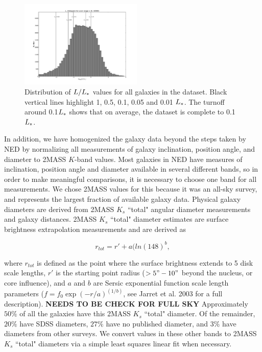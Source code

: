\documentclass[iop]{emulateapj-rtx4}
\begin{document}
\begin{figure}[ht!]
        \centering
        \vspace{-10pt}
        \includegraphics[width=0.52\textwidth]{completeness_hist.pdf}
        \caption{\small{Distribution of $L/L_{\**}$ values for all galaxies in the dataset. Black vertical lines highlight 1, 0.5, 0.1, 0.05 and 0.01 $L_{\**}$. The turnoff around 0.1$L_{\**}$ shows that on average, the dataset is complete to 0.1$L_{\**}$.}}
        \label{completeness}
\end{figure} 

In addition, we have homogenized the galaxy data beyond the steps taken by NED by normalizing all measurements of galaxy inclination, position angle, and diameter to 2MASS $K$-band values. Most galaxies in NED have measures of inclination, position angle and diameter available in several different bands, so in order to make meaningful comparisons, it is necessary to choose one band for all measurements. We chose 2MASS values for this because it was an all-sky survey, and represents the largest fraction of available galaxy data. Physical galaxy diameters are derived from 2MASS $K_s$ ``total" angular diameter measurements and galaxy distances. 2MASS $K_s$ ``total" diameter estimates are surface brightness extrapolation measurements and are derived as 

\begin{equation}
r_{tot} = r' + a(ln(148)^b,
\end{equation}

\noindent where $r_{tot}$ is defined as the point where the surface brightness extends to 5 disk scale lengths, $r'$ is the starting point radius ($>5" - 10"$ beyond the nucleus, or core influence), and $a$ and $b$ are Sersic exponential function scale length parameters ($f = f_0 \exp{(-r/a)}^{(1/b)}$, see Jarret et al. 2003 for a full description). \textbf{NEEDS TO BE CHECK FOR FULL SKY} Approximately $50\%$ of all the galaxies have this 2MASS $K_s$ ``total" diameter. Of the remainder, $20\%$ have SDSS diameters, $27\%$ have no published diameter, and $3\%$ have diameters from other surveys. We convert values in these other bands to 2MASS $K_s$ ``total" diameters via a simple least squares linear fit when necessary.
\end{document}
